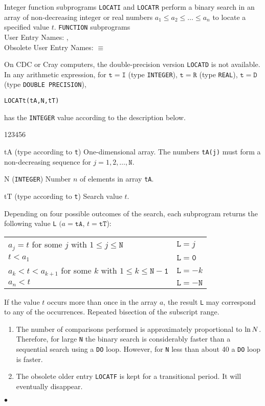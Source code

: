                              
               
\Submitter{}                                 
                       
Integer function subprograms {\tt LOCATI} and {\tt LOCATR} perform
a binary search in an array of non-decreasing integer or real numbers
$a_1\leq a_2\leq \ldots \leq a_n$ to locate a specified value $t$.
\Structure
{\tt FUNCTION} subprograms \\
User Entry Names: ,  \\
Obsolete User Entry Names:  $\equiv$ 
\par
On CDC or Cray computers, the double-precision version {\tt LOCATD}
is not available.
\Usage
In any arithmetic expression, for $\mathtt{t=I}$ (type {\tt INTEGER}),
$\mathtt{t=R}$ (type {\tt REAL}), $\mathtt{t=D}$
(type {\tt DOUBLE PRECISION}),
\begin{center}
{\tt LOCATt(tA,N,tT)}
\end{center}
has the {\tt INTEGER} value according to the description below.
\begin{DLtt}{123456}
\item [tA] (type according to {\tt t}) One-dimensional array.
The numbers {\tt tA(j)} must form a non-decreasing
sequence for $j=1,2,\ldots,\mathtt{N}$.
\item [N] ({\tt INTEGER}) Number $n$ of elements in array {\tt tA}.
\item[tT] (type according to {\tt t}) Search value $t$.
\end{DLtt}
Depending on four possible outcomes of the search, each subprogram
returns the following value {\tt L} $(a = \mathtt{tA}$,
$t = \mathtt{tT}$):
\begin{center}
\begin{tabular}{ll}
$a_j = t$ for some $j$ with $1 \leq j \leq \mathtt{N}$ &
$\mathtt{L}=j$ \\
$t < a_1$ & $\mathtt{L = 0}$ \\
$a_k < t < a_{k+1}$ for some $k$ with $1 \leq k \leq \mathtt{N-1}$ &
$\mathtt{L}=-k$ \\
$a_n < t$ & $\mathtt{L=-N}$
\end{tabular}
\end{center}
If the value $t$ occurs more than once in the array $a$,
the result {\tt L} may correspond to any of the occurrences.
\Method
Repeated bisection of the subscript range.
\Notes
\begin{enumerate}
\item The number of comparisons performed is approximately proportional
to $\ln {\tt N}$. Therefore, for large {\tt N} the binary search is
considerably faster than a sequential search using a {\tt DO} loop.
However, for {\tt N} less than about 40 a {\tt DO} loop is faster.
\item
The obsolete older entry {\tt LOCATF} is kept for a transitional
period. It will eventually disappear.
\end{enumerate}
$\bullet$
